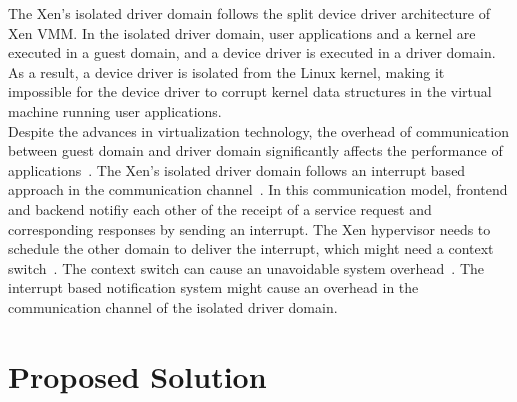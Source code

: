 The Xen's isolated driver domain follows the split device driver architecture of Xen VMM. In the isolated driver domain, user applications and a kernel are executed in a guest domain, and a device driver is executed in a driver domain. As a result, a device driver is isolated from the Linux kernel, making it impossible for the device driver to corrupt kernel data structures in the virtual machine running user applications. 
\\[3mm]
Despite the advances in virtualization technology, the overhead of communication between guest domain and driver domain significantly affects the performance of applications~\cite{Barham:2003:XAV:945445.945462, Sugerman:2001:VID:647055.715774, Menon:2006:ONV:1267359.1267361}. The Xen's isolated driver domain follows an interrupt based approach in the communication channel~\cite{Barham:2003:XAV:945445.945462}. In this communication model, frontend and backend notifiy each other of the receipt of a service request and corresponding responses by sending an interrupt. The Xen hypervisor needs to schedule the other domain to deliver the interrupt, which might need a context switch~\cite{Barham:2003:XAV:945445.945462}. The context switch can cause an unavoidable system overhead~\cite{Li:2007:QCC:1281700.1281702, Mogul:1991:ECS:106973.106982}. The interrupt based notification system might cause an overhead in the communication channel of the isolated driver domain. 

\section {Proposed Solution}

